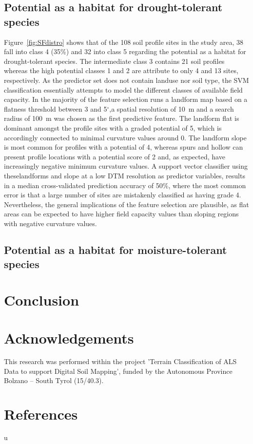 \documentclass[preprint,12pt,authoryear]{elsarticle}
\begin{document}
\subsection{Potential as a habitat for drought-tolerant species}
Figure~\ref{fig:SFdistro} shows that of the 108 soil profile sites in the study area, 38 fall into class 4 (35\%) and 32 into class 5 regarding the potential as a habitat for drought-tolerant species. The intermediate class 3 contains 21 soil profiles whereas the high potential classes 1 and 2 are attribute to only 4 and 13 sites, respectively. 
As the predictor set does not contain landuse nor soil type, the SVM classification essentially attempts to model the different classes of available field capacity. In the majority of the feature selection runs a landform map based on a flatness threshold between 3 and 5$^{\circ}$,a spatial resolution of 10~m and a search radius of 100~m was chosen as the first predictive feature. The landform flat is dominant amongst the profile sites with a graded potential of 5, which is accordingly connected to minimal curvature values around 0. The landform slope is  most common for profiles with a potential  of 4, whereas spurs and hollow can present profile locations with a  potential score of 2 and, as expected, have increasingly negative minimum curvature values. A support vector classifier using theselandforms and slope at a low DTM resolution as predictor variables, results in a median cross-validated prediction accuracy of 50\%, where the most common error is that  a large number of sites are mistakenly classified as having grade 4. Nevertheless, the general implications of the feature selection are plausible, as flat areas  can  be expected to have higher field capacity values than sloping regions with negative curvature values.
\subsection{Potential as a habitat for moisture-tolerant species}
\section{Conclusion}
 

\section*{Acknowledgements} This research was performed within the project 'Terrain Classification of ALS Data to support Digital Soil Mapping', funded by the Autonomous Province Bolzano -- South Tyrol (15/40.3).

\section*{References}
u
\end{document}
